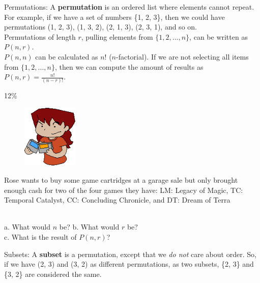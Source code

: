\documentclass[a4paper,12pt]{book}
\begin{document}
        \begin{intro}{Permutations:}
            A \textbf{permutation} is an ordered list where elements cannot repeat.
            For example, if we have a set of numbers \{1, 2, 3\}, then
            we could have permutations (1, 2, 3), (1, 3, 2), (2, 1, 3), (2, 3, 1),
            and so on. ~\\

            Permutations of length $r$, pulling elements from
            $\{1, 2, ..., n\}$, can be written as $P(n,r)$. ~\\

            $P(n, n)$ can be calculated as $n!$ ($n$-factorial). If we are
            not selecting all items from $\{1, 2, ..., n\}$, then we can
            compute the amount of results as         
            $P(n, r) = \frac{n!}{(n-r)!}$.
        \end{intro}

        \begin{question}{3}{12\%}

            \begin{figure}
                \includegraphics[height=3cm]{images/5-3-games.png}
            \end{figure}
        
            Rose wants to buy some game cartridges at a garage sale
            but only brought enough cash for two of the four games they have:
            LM: Legacy of Magic, TC: Temporal Catalyst, CC: Concluding Chronicle, and DT: Dream of Terra

            ~\\
            \tab a. What would $n$ be?
            \tab b. What would $r$ be? \\
            \tab c. What is the result of $P(n, r)$?
        \end{question}

    \begin{intro}{Subsets:}
        A \textbf{subset} is a permutation, except that we \textit{do not}
        care about order. So, if we have (2, 3) and (3, 2) as different
        permutations, as two subsets, \{2, 3\} and \{3, 2\} are considered
        the same.
    \end{intro}
\end{document}
